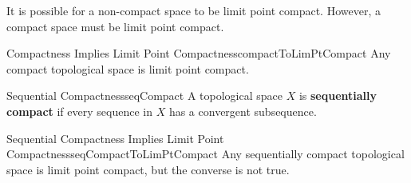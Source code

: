 \documentclass[math]{amznotes}
\theoremstyle{remark}
\begin{document}
It is possible for a non-compact space to be limit point compact. However, a compact space must be limit point compact.
\begin{probox}{Compactness Implies Limit Point Compactness}{compactToLimPtCompact}
    Any compact topological space is limit point compact.
\end{probox}
\begin{dfnbox}{Sequential Compactness}{seqCompact}
    A topological space $X$ is {\color{red} \textbf{sequentially compact}} if every sequence in $X$ has a convergent subsequence.
\end{dfnbox}
\begin{probox}{Sequential Compactness Implies Limit Point Compactness}{seqCompactToLimPtCompact}
    Any sequentially compact topological space is limit point compact, but the converse is not true.
\end{probox}
\end{document}
